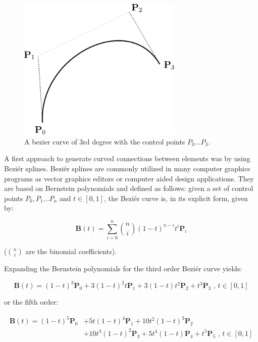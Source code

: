 \begin{figure}
\centering
\includegraphics[width=0.7\textwidth]{images/smooth/bezier_3rd.pdf}
\caption{A bezier curve of 3rd degree with the control points $P_0 \ldots P_3$.}
\label{fig:bez_3rd}
\end{figure}

A first approach to generate curved connections between elements was by using Beziér splines. Beziér splines are commonly utilized in many computer graphics programs as vector graphics editors or computer aided design applications. They are based on Bernstein polynomials and defined as follows: given a set of control points $P_0, P_1 \ldots P_n$ and $t \in \left[ 0, 1\right]$, the Beziér curve is, in its explicit form, given by:

\begin{equation}
\mathbf{B}(t) = \sum_{i=0}^n {n\choose i}(1 - t)^{n - i}t^i\mathbf{P}_i
\end{equation}

(${n\choose i}$ are the binomial coefficients).

Expanding the Bernstein polynomials for the third order Beziér curve yields:

\begin{equation}
\mathbf{B}(t)=(1-t)^3\mathbf{P}_0+3(1-t)^2t\mathbf{P}_1+3(1-t)t^2\mathbf{P}_2+t^3\mathbf{P}_3 \mbox{ , } t \in [0,1]
\end{equation}

or the fifth order:

\begin{equation}
\begin{split}
\mathbf{B}(t) = (1 - t)^5\mathbf{P}_0 & + 5t(1 - t)^4\mathbf{P}_1 + 10t^2(1 - t)^3 \mathbf{P}_2 \\ 
& +  10t^3 (1-t)^2 \mathbf{P}_3 + 5t^4(1-t) \mathbf{P}_4 + t^5 \mathbf{P}_5 \mbox{ , } t \in [0,1]
\end{split}
\label{bez_quint}
\end{equation}

